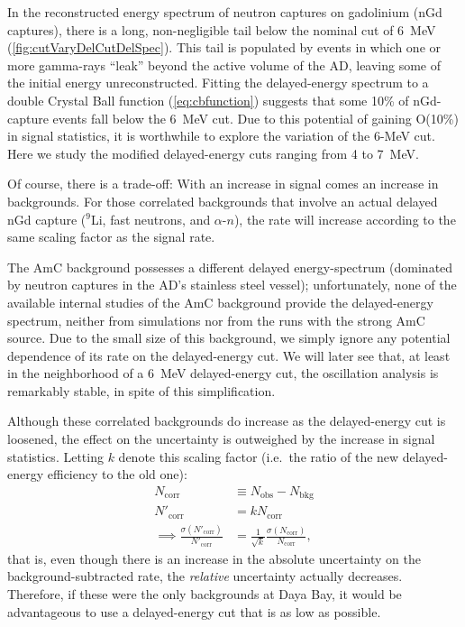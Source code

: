 \documentclass[../thesis.tex]{subfiles}
\begin{document}
In the reconstructed energy spectrum of neutron captures on gadolinium (nGd captures), there is a long, non-negligible tail below the nominal cut of 6~MeV (\autoref{fig:cutVaryDelCutDelSpec}). This tail is populated by events in which one or more gamma-rays ``leak'' beyond the active volume of the AD, leaving some of the initial energy unreconstructed. Fitting the delayed-energy spectrum to a double Crystal Ball function (\autoref{eq:cbfunction}) suggests that some 10\% of nGd-capture events fall below the 6~MeV cut. Due to this potential of gaining O(10\%) in signal statistics, it is worthwhile to explore the variation of the 6-MeV cut. Here we study the modified delayed-energy cuts ranging from 4 to 7~MeV.

Of course, there is a trade-off: With an increase in signal comes an increase in backgrounds. For those correlated backgrounds that involve an actual delayed nGd capture ($^9$Li, fast neutrons, and $\alpha$-$n$), the rate will increase according to the same scaling factor as the signal rate.

The AmC background possesses a different delayed energy-spectrum (dominated by neutron captures in the AD's stainless steel vessel); unfortunately, none of the available internal studies of the AmC background provide the delayed-energy spectrum, neither from simulations nor from the runs with the strong AmC source. Due to the small size of this background, we simply ignore any potential dependence of its rate on the delayed-energy cut. We will later see that, at least in the neighborhood of a 6~MeV delayed-energy cut, the oscillation analysis is remarkably stable, in spite of this simplification.

Although these correlated backgrounds do increase as the delayed-energy cut is loosened, the effect on the uncertainty is outweighed by the increase in signal statistics. Letting $k$ denote this scaling factor (i.e.\ the ratio of the new delayed-energy efficiency to the old one):
\begin{align}
  \label{eq:cutVaryDelayedNcorrSigma}
  N_{\mathrm{corr}} &\equiv N_{\mathrm{obs}} - N_{\mathrm{bkg}} \\
  N'_{\mathrm{corr}} &= k N_{\mathrm{corr}} \\
  \implies \frac{\sigma(N'_{\mathrm{corr}})}{N'_{\mathrm{corr}}} &= \frac{1}{\sqrt{k}} \frac{\sigma(N_{\mathrm{corr}})}{N_{\mathrm{corr}}},
\end{align}
that is, even though there is an increase in the absolute uncertainty on the background-subtracted rate, the \emph{relative} uncertainty actually decreases. Therefore, if these were the only backgrounds at Daya Bay, it would be advantageous to use a delayed-energy cut that is as low as possible.
\end{document}
